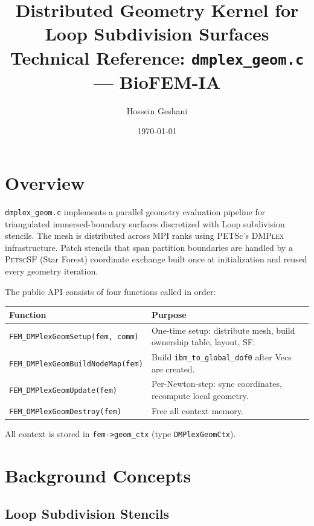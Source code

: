 \documentclass[11pt]{article}
\title{\textbf{Distributed Geometry Kernel for Loop Subdivision Surfaces}\\
       \large Technical Reference: \texttt{dmplex\_geom.c} --- BioFEM-IA}
\author{Hossein Geshani}
\date{\today}
\begin{document}
\maketitle
\tableofcontents
\newpage

\section{Overview}

\texttt{dmplex\_geom.c} implements a parallel geometry evaluation pipeline
for triangulated immersed-boundary surfaces discretized with Loop subdivision
stencils.  The mesh is distributed across MPI ranks using PETSc's \textsc{DMPlex}
infrastructure.  Patch stencils that span partition boundaries are handled by
a \textsc{PetscSF} (Star Forest) coordinate exchange built once at initialization
and reused every geometry iteration.

The public API consists of four functions called in order:

\begin{center}
\begin{tabular}{lp{8cm}}
\toprule
Function & Purpose \\
\midrule
\texttt{FEM\_DMPlexGeomSetup(fem, comm)} & One-time setup: distribute mesh, build ownership table, layout, SF. \\
\texttt{FEM\_DMPlexGeomBuildNodeMap(fem)} & Build \texttt{ibm\_to\_global\_dof0} after Vecs are created. \\
\texttt{FEM\_DMPlexGeomUpdate(fem)} & Per-Newton-step: sync coordinates, recompute local geometry. \\
\texttt{FEM\_DMPlexGeomDestroy(fem)} & Free all context memory. \\
\bottomrule
\end{tabular}
\end{center}

All context is stored in \texttt{fem->geom\_ctx} (type \texttt{DMPlexGeomCtx}).

\section{Background Concepts}

\subsection{Loop Subdivision Stencils}
\end{document}
